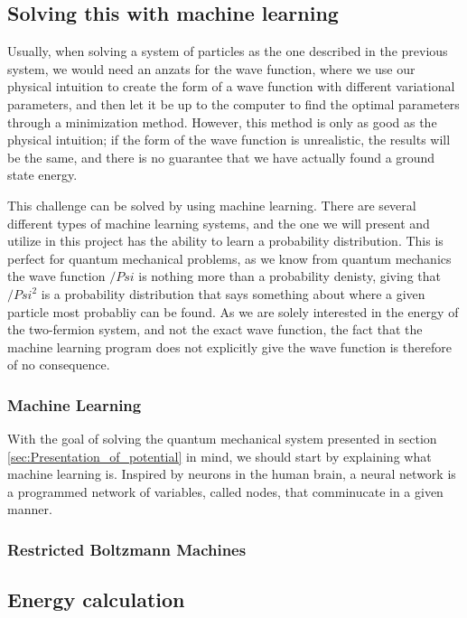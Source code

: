 \documentclass[norsk,a4paper,12pt]{article}
\begin{document}
\subsection{Solving this with machine learning}
Usually, when solving a system of particles as the one described in the previous system, we would need an anzats for the wave function, where we use our physical intuition to create the form of a wave function with different variational parameters, and then let it be up to the computer to find the optimal parameters through a minimization method. However, this method is only as good as the physical intuition; if the form of the wave function is unrealistic, the results will be the same, and there is no guarantee that we have actually found a ground state energy.
\par 
\vspace{3mm}
This challenge can be solved by using machine learning. There are several different types of machine learning systems, and the one we will present and utilize in this project has the ability to learn a probability distribution. This is perfect for quantum mechanical problems, as we know from quantum mechanics the wave function $/Psi$ is nothing more than a probability denisty, giving that $/Psi^2$ is a probability distribution that says something about where a given particle most probabliy can be found. As we are solely interested in the energy of the two-fermion system, and not the exact wave function, the fact that the machine learning program does not explicitly give the wave function is therefore of no consequence.

\subsubsection{Machine Learning}
With the goal of solving the quantum mechanical system presented in section \ref{sec:Presentation_of_potential} in mind, we should start by explaining what machine learning is. Inspired by neurons in the human brain, a neural network is a programmed network of variables, called nodes, that comminucate in a given manner.  

\subsubsection{Restricted Boltzmann Machines}

\subsection{Energy calculation}
\end{document}
